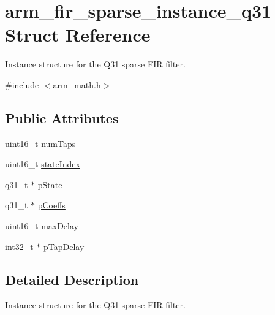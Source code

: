 \hypertarget{structarm__fir__sparse__instance__q31}{\section{arm\-\_\-fir\-\_\-sparse\-\_\-instance\-\_\-q31 Struct Reference}
\label{structarm__fir__sparse__instance__q31}
}


Instance structure for the Q31 sparse F\-I\-R filter.  




{\ttfamily \#include $<$arm\-\_\-math.\-h$>$}

\subsection*{Public Attributes}
\begin{DoxyCompactItemize}
\item 
uint16\-\_\-t \hyperlink{structarm__fir__sparse__instance__q31_a07b6c01e58ec6dde384719130d36b0dc}{num\-Taps}
\item 
uint16\-\_\-t \hyperlink{structarm__fir__sparse__instance__q31_a557ed9d477e76e4ad2019344f19f568a}{state\-Index}
\item 
q31\-\_\-t $\ast$ \hyperlink{structarm__fir__sparse__instance__q31_a830be89daa5a393b225048889aa045d1}{p\-State}
\item 
q31\-\_\-t $\ast$ \hyperlink{structarm__fir__sparse__instance__q31_a093d6227f0d1597982cd083fb126f4e0}{p\-Coeffs}
\item 
uint16\-\_\-t \hyperlink{structarm__fir__sparse__instance__q31_afdd3a1dc72132c854dc379154b68b674}{max\-Delay}
\item 
int32\-\_\-t $\ast$ \hyperlink{structarm__fir__sparse__instance__q31_ab87ae457adec8f727afefaa2599fc983}{p\-Tap\-Delay}
\end{DoxyCompactItemize}


\subsection{Detailed Description}
Instance structure for the Q31 sparse F\-I\-R filter. 


